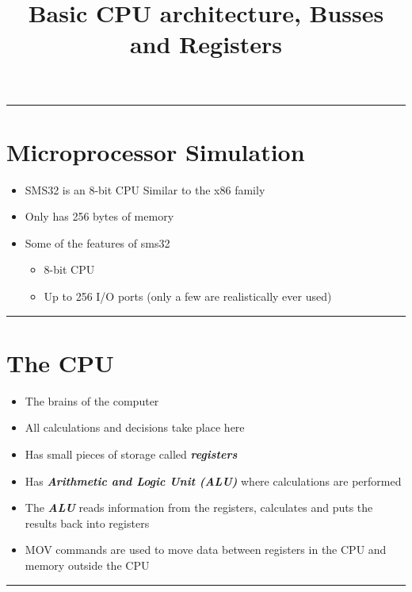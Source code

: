 \documentclass{article}
\title{Basic CPU architecture, Busses and Registers}
\begin{document}
  \maketitle

  \begin{center}
    \rule{0.5\textwidth}{.4pt}
  \end{center}
  \section{Microprocessor Simulation}
  \begin{itemize}
    \item{SMS32 is an 8-bit CPU Similar to the x86 family}
    \item{Only has 256 bytes of memory}
    \item{Some of the features of sms32}
    \begin{itemize}
      \item{8-bit CPU}
      \item{Up to 256 I/O ports (only a few are realistically ever used)}
    \end{itemize}
  \end{itemize}
  \begin{center}
    \rule{0.5\textwidth}{.4pt}
  \end{center}
  \section{The CPU}
  \begin{itemize}
    \item{The brains of the computer}
    \item{All calculations and decisions take place here}
    \item{Has small pieces of storage called \textbf{\textit{registers}}}
    \item{Has \textbf{\textit{Arithmetic and Logic Unit (ALU)}} where calculations are performed}
    \item{The \textbf{\textit{ALU}} reads information from the registers, calculates and puts the results back into registers}
    \item{MOV commands are used to move data between registers in the CPU and memory outside the CPU}
  \end{itemize}

  \begin{center}
    \rule{0.5\textwidth}{0.4pt}
  \end{center}
\end{document}
